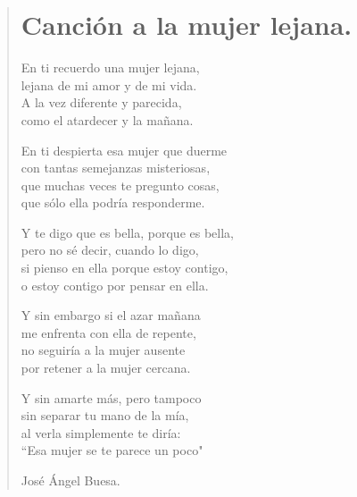 \documentclass[11pt, portrait, twoside, notitlepage, openright]{book}
\begin{document}
\begin{verse}
\begin{center}
\section{Canción a la mujer lejana.}
\end{center}
En ti recuerdo una mujer lejana,\\
lejana de mi amor y de mi vida.\\
A la vez diferente y parecida,\\
como el atardecer y la mañana.
\newline

En ti despierta esa mujer que duerme\\
con tantas semejanzas misteriosas,\\
que muchas veces te pregunto cosas,\\
que sólo ella podría responderme.
\newline

Y te digo que es bella, porque es bella,\\
pero no sé decir, cuando lo digo,\\
si pienso en ella porque estoy contigo,\\
o estoy contigo por pensar en ella.
\newline

Y sin embargo si el azar mañana\\
me enfrenta con ella de repente,\\
no seguiría a la mujer ausente\\
por retener a la mujer cercana.
\newpage

Y sin amarte más, pero tampoco\\
sin separar tu mano de la mía,\\
al verla simplemente te diría:\\
``Esa mujer se te parece un poco"
\newline

\begin{flushright}
José Ángel Buesa.
\end{flushright}
\end{verse}
\end{document}

